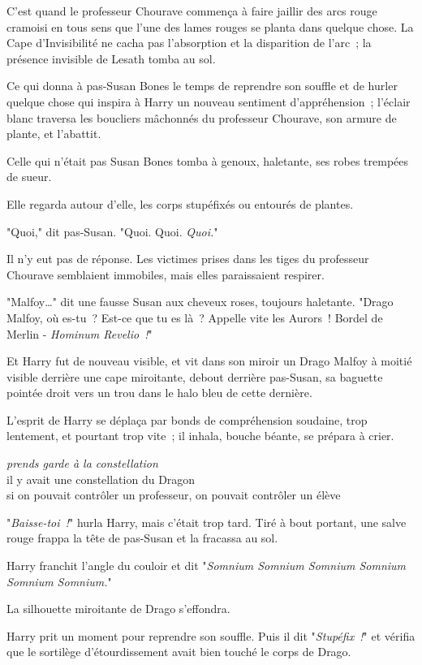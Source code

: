 C'est quand le professeur Chourave commença à faire jaillir des arcs rouge cramoisi en tous sens que l'une des lames rouges se planta dans quelque chose. La Cape d'Invisibilité ne cacha pas l'absorption et la disparition de l'arc~; la présence invisible de Lesath tomba au sol.

Ce qui donna à pas-Susan Bones le temps de reprendre son souffle et de hurler quelque chose qui inspira à Harry un nouveau sentiment d'appréhension~; l'éclair blanc traversa les boucliers mâchonnés du professeur Chourave, son armure de plante, et l'abattit.

Celle qui n'était pas Susan Bones tomba à genoux, haletante, ses robes trempées de sueur.

Elle regarda autour d'elle, les corps stupéfixés ou entourés de plantes.

"Quoi," dit pas-Susan. "Quoi. Quoi. \emph{Quoi.}"

Il n'y eut pas de réponse. Les victimes prises dans les tiges du professeur Chourave semblaient immobiles, mais elles paraissaient respirer.

"Malfoy…" dit une fausse Susan aux cheveux roses, toujours haletante. "Drago Malfoy, où es-tu~? Est-ce que tu es là~? Appelle vite les Aurors~! Bordel de Merlin - \emph{Hominum Revelio~!}"

Et Harry fut de nouveau visible, et vit dans son miroir un Drago Malfoy à moitié visible derrière une cape miroitante, debout derrière pas-Susan, sa baguette pointée droit vers un trou dans le halo bleu de cette dernière.

L'esprit de Harry se déplaça par bonds de compréhension soudaine, trop lentement, et pourtant trop vite~; il inhala, bouche béante, se prépara à crier.

\emph{prends garde à la constellation}\\ il y avait une constellation du Dragon\\ si on pouvait contrôler un professeur, on pouvait contrôler un élève

"\emph{Baisse-toi~!}" hurla Harry, mais c'était trop tard. Tiré à bout portant, une salve rouge frappa la tête de pas-Susan et la fracassa au sol.

Harry franchit l'angle du couloir et dit "\emph{Somnium Somnium Somnium Somnium Somnium Somnium.}"

La silhouette miroitante de Drago s'effondra.

Harry prit un moment pour reprendre son souffle. Puis il dit "\emph{Stupéfix~!}" et vérifia que le sortilège d'étourdissement avait bien touché le corps de Drago.

